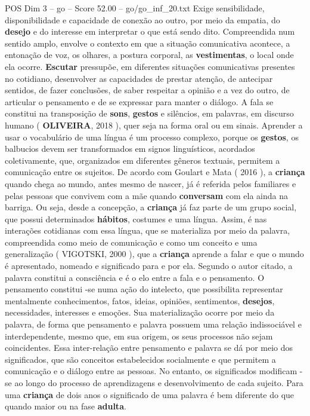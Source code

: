 \begin{textsample}{POS Dim 3 – go – Score 52.00 – go/go\_inf\_20.txt}
Exige sensibilidade, disponibilidade e capacidade de conexão ao outro, por meio da empatia, do \textbf{desejo} e do interesse em interpretar o que está sendo dito.
Compreendida num sentido amplo, envolve o contexto em que a situação comunicativa acontece, a entonação de voz, os olhares, a postura corporal, as \textbf{vestimentas}, o local onde ela ocorre. \textbf{Escutar} pressupõe, em diferentes situações comunicativas presentes no cotidiano, desenvolver as capacidades de prestar atenção, de antecipar sentidos, de fazer conclusões, de saber respeitar a opinião e a vez do outro, de articular o pensamento e de se expressar para manter o diálogo.
A fala se constitui na transposição de \textbf{sons}, \textbf{gestos} e silêncios, em palavras, em discurso humano ( \textbf{OLIVEIRA}, 2018 ), quer seja na forma oral ou em sinais.
Aprender a usar o vocabulário de uma língua é um processo complexo, porque os \textbf{gestos}, os balbucios devem ser transformados em signos linguísticos, acordados coletivamente, que, organizados em diferentes gêneros textuais, permitem a comunicação entre os sujeitos.
De acordo com Goulart e Mata ( 2016 ), a \textbf{criança} quando chega ao mundo, antes mesmo de nascer, já é referida pelos familiares e pelas pessoas que convivem com a mãe quando \textbf{conversam} com ela ainda na barriga.
Ou seja, desde a concepção, a \textbf{criança} já faz parte de um grupo social, que possui determinados \textbf{hábitos}, costumes e uma língua.
Assim, é nas interações cotidianas com essa língua, que se materializa por meio da palavra, compreendida como meio de comunicação e como um conceito e uma generalização ( VIGOTSKI, 2000 ), que a \textbf{criança} aprende a falar e que o mundo é apresentado, nomeado e significado para e por ela.
Segundo o autor citado, a palavra constitui a consciência e é o elo entre a fala e o pensamento.
O pensamento constitui -se numa ação do intelecto, que possibilita representar mentalmente conhecimentos, fatos, ideias, opiniões, sentimentos, \textbf{desejos}, necessidades, interesses e emoções.
Sua materialização ocorre por meio da palavra, de forma que pensamento e palavra possuem uma relação indissociável e interdependente, mesmo que, em sua origem, os seus processos não sejam coincidentes.
Essa inter-relação entre pensamento e palavra se dá por meio dos significados, que são conceitos estabelecidos socialmente e que permitem a comunicação e o diálogo entre as pessoas.
No entanto, os significados modificam -se ao longo do processo de aprendizagens e desenvolvimento de cada sujeito.
Para uma \textbf{criança} de dois anos o significado de uma palavra é bem diferente do que quando maior ou na fase \textbf{adulta}.

\end{textsample}
